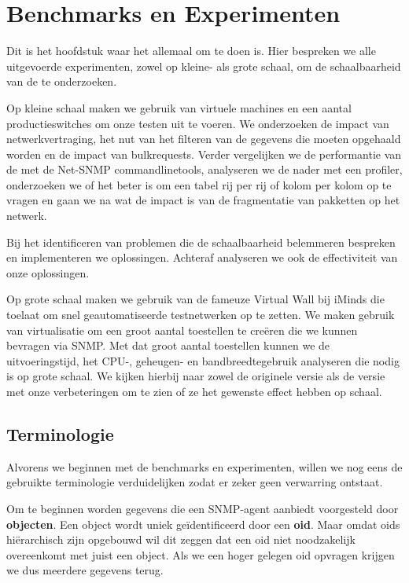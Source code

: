\chapter{Benchmarks en Experimenten}

Dit is het hoofdstuk waar het allemaal om te doen is.
Hier bespreken we alle uitgevoerde experimenten, zowel op kleine- als grote schaal, om de schaalbaarheid van de \nwmretriever{} te onderzoeken.

Op kleine schaal maken we gebruik van virtuele machines en een aantal productieswitches om onze testen uit te voeren.
We onderzoeken de impact van netwerkvertraging, het nut van het filteren van de gegevens die moeten opgehaald worden en de impact van bulkrequests.
Verder vergelijken we de performantie van de \nwmretriever{} met de Net-SNMP commandlinetools,
analyseren we de \nwmretriever{} nader met een profiler, onderzoeken we of het beter is om een tabel rij per rij of kolom per kolom op te vragen
en gaan we na wat de impact is van de fragmentatie van pakketten op het netwerk.

Bij het identificeren van problemen die de schaalbaarheid belemmeren bespreken en implementeren we oplossingen.
Achteraf analyseren we ook de effectiviteit van onze oplossingen.

Op grote schaal maken we gebruik van de fameuze Virtual Wall bij iMinds die toelaat om snel geautomatiseerde testnetwerken op te zetten.
We maken gebruik van virtualisatie om een groot aantal toestellen te creëren die we kunnen bevragen via SNMP.
Met dat groot aantal toestellen kunnen we de uitvoeringstijd, het CPU-, geheugen- en bandbreedtegebruik analyseren die nodig is op grote schaal.
We kijken hierbij naar zowel de originele versie als de versie met onze verbeteringen om te zien of ze het gewenste effect hebben op schaal.


\section{Terminologie}

Alvorens we beginnen met de benchmarks en experimenten, willen we nog eens de gebruikte terminologie verduidelijken zodat er zeker geen verwarring ontstaat.

Om te beginnen worden gegevens die een SNMP-agent aanbiedt voorgesteld door \textbf{objecten}.
Een object wordt uniek geïdentificeerd door een \textbf{\gls{oid}}.
Maar omdat \glspl{oid} hiërarchisch zijn opgebouwd wil dit zeggen dat een \gls{oid} niet noodzakelijk overeenkomt met juist een object.
Als we een hoger gelegen \gls{oid} opvragen krijgen we dus meerdere gegevens terug.

